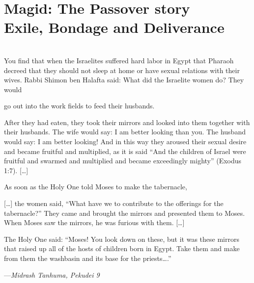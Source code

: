 \documentclass[letter,11pt,openany]{memoir}
\newcommand{\HgSource}[1]{\hfill{\small---\itshape{#1}}}
\newenvironment{HgEnglish}{\strut\\
\noindent}{\vspace{1em}}
\begin{document}
\chapter*{Magid: The Passover story \\
{\LARGE Exile, Bondage and Deliverance}}
\begin{HgEnglish}
	You find that when the Israelites suffered hard labor in Egypt that Pharaoh decreed that they should not sleep at home or have sexual relations with their wives. Rabbi Shimon ben Halafta said: What did the Israelite women do? They would 
	
	go out into the work fields to feed their husbands. 
	
	After they had eaten, they took their mirrors and looked into them together with their husbands. The wife would say: I am better looking than you. The husband would say: I am better looking! And in this way they aroused their sexual desire and became fruitful and multiplied, as it is said ``And the children of Israel were fruitful and swarmed and multiplied and became exceedingly mighty'' (Exodus 1:7). [\ldots]
	
	As soon as the Holy One told Moses to make the tabernacle, 
	
	[\ldots] the women said, ``What have we to contribute to the offerings for the tabernacle?'' They came and brought the mirrors and presented them to Moses. When Moses saw the mirrors, he was furious with them. [\ldots]
	
	The Holy One said: ``Moses! You look down on these, but it was these mirrors that raised up all of the hosts of children born in Egypt. Take them and make from them the washbasin and its base for the priests\ldots.''
	
	\HgSource{Midrash Tanhuma, Pekudei 9} 
\end{HgEnglish}
\end{document}
